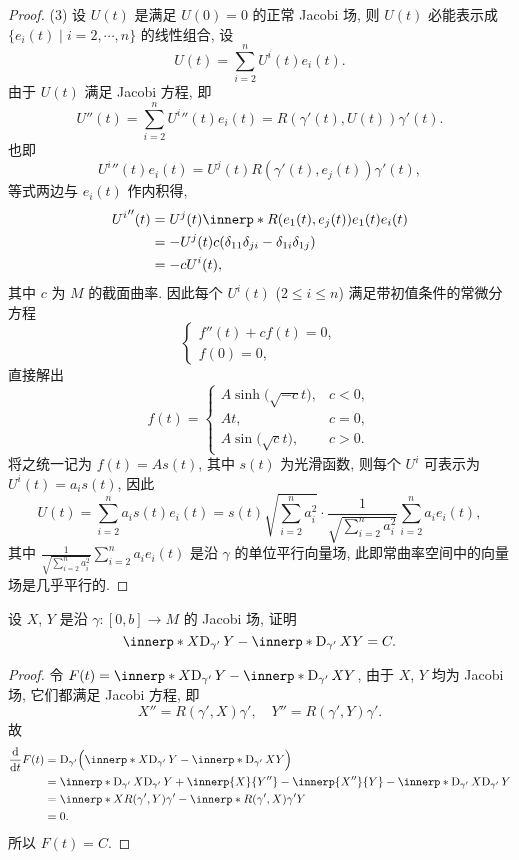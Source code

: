\begin{proof}
  (3) 设 $U(t)$ 是满足 $U(0)=0$ 的正常 Jacobi 场, 则 $U(t)$ 必能表示成
  $\{e_i(t)\mid i=2,\cdots,n\}$ 的线性组合, 设
  \[U(t) = \sum_{i=2}^n U^i(t)e_i(t).\]
  由于 $U(t)$ 满足 Jacobi 方程, 即
  \[U''(t) = \sum_{i=2}^n {U^i}''(t)e_i(t) = R(\gamma'(t),U(t))\gamma'(t).\]
  也即
  \[{U^i}''(t)e_i(t) = U^j(t)R(\gamma'(t),e_j(t))\gamma'(t),\]
  等式两边与 $e_i(t)$ 作内积得,
  \begin{align*}
    {U^i}''(t)
    & = U^j(t)\innerp*{R(e_1(t),e_j(t))e_1(t)}{e_i(t)} \\
    & = - U^j(t)c(\delta_{11}\delta_{ji} - \delta_{1i}\delta_{1j}) \\
    & = - cU^i(t),
  \end{align*}
  其中 $c$ 为 $M$ 的截面曲率. 因此每个 $U^i(t)$ ($2\leq i\leq n$)
  满足带初值条件的常微分方程
  \[\begin{cases}
    f''(t)+cf(t)=0, \\
    f(0) = 0,
  \end{cases}\]
  直接解出
  \[f(t) = \begin{cases}
    A\sinh\bigl(\sqrt{-c}t\bigr), & c<0, \\
    At, & c=0, \\
    A\sin\bigl(\sqrt{c}t\bigr), & c>0.
  \end{cases}\]
  将之统一记为 $f(t) = As(t)$, 其中 $s(t)$ 为光滑函数, 则每个 $U^i$ 可表示为 $U^i(t)=a_is(t)$,
  因此
  \[U(t) = \sum_{i=2}^n a_is(t)e_i(t) = 
    s(t)\sqrt{\sum_{i=2}^n a_i^2}\cdot\frac{1}{\sqrt{\sum_{i=2}^n a_i^2}}\sum_{i=2}^n a_ie_i(t),\]
  其中 $\frac{1}{\sqrt{\sum_{i=2}^n a_i^2}}\sum_{i=2}^n a_ie_i(t)$
  是沿 $\gamma$ 的单位平行向量场, 此即常曲率空间中的向量场是几乎平行的.
\end{proof}



\begin{exercise}
  设 $X$, $Y$ 是沿 $\gamma\colon [0,b]\to M$ 的 Jacobi 场, 证明
  \[\innerp*{X}{\D_{\gamma'}Y} - \innerp*{\D_{\gamma'}X}{Y} = C.\]
\end{exercise}

\begin{proof}
  令 $F(t)=\innerp*{X}{\D_{\gamma'}Y} - \innerp*{\D_{\gamma'}X}{Y}$,
  由于 $X$, $Y$ 均为 Jacobi 场, 它们都满足 Jacobi 方程, 即
  \[X'' = R(\gamma', X)\gamma',\quad Y'' = R(\gamma',Y)\gamma'.\]
  故
  \begin{align*}
    \frac{\diff}{\diff t}F(t)
    & = \D_{\gamma'}\Bigl(\innerp*{X}{\D_{\gamma'}Y} - \innerp*{\D_{\gamma'}X}{Y}\Bigr) \\
    & = \innerp*{\D_{\gamma'}X}{\D_{\gamma'}Y} + \innerp{X}{Y''}
      - \innerp{X''}{Y} - \innerp*{\D_{\gamma'}X}{\D_{\gamma'}Y} \\
    & = \innerp*{X}{R(\gamma',Y)\gamma'} - \innerp*{R(\gamma',X)\gamma'}{Y} \\
    & = 0.
  \end{align*}
  所以 $F(t)=C$.
\end{proof}




